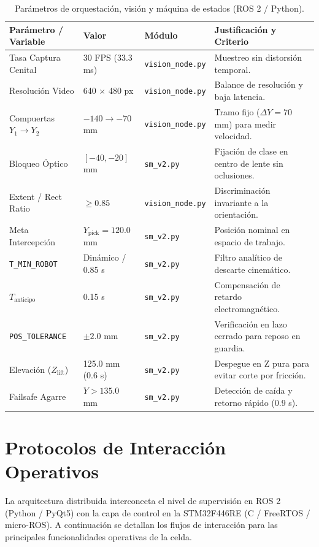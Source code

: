\documentclass[12pt, a4paper]{report}
\begin{document}
\begin{table}[H]
\centering
\small
\begin{tabularx}{\linewidth}{|p{3.1cm}|p{2.2cm}|p{2.5cm}|X|}
\hline
\textbf{Parámetro / Variable} & \textbf{Valor} & \textbf{Módulo} & \textbf{Justificación y Criterio} \\
\hline
Tasa Captura Cenital & 30 FPS (33.3 ms) & \texttt{vision\_node.py} & Muestreo sin distorsión temporal. \\
\hline
Resolución Video & 640 $\times$ 480 px & \texttt{vision\_node.py} & Balance de resolución y baja latencia. \\
\hline
Compuertas $Y_1 \rightarrow Y_2$ & $-140 \rightarrow -70$ mm & \texttt{vision\_node.py} & Tramo fijo ($\Delta Y = 70$ mm) para medir velocidad. \\
\hline
Bloqueo Óptico & $[-40, -20]$ mm & \texttt{sm\_v2.py} & Fijación de clase en centro de lente sin oclusiones. \\
\hline
Extent / Rect Ratio & $\ge 0.85$ & \texttt{vision\_node.py} & Discriminación invariante a la orientación. \\
\hline
Meta Intercepción & $Y_{\text{pick}} = 120.0$ mm & \texttt{sm\_v2.py} & Posición nominal en espacio de trabajo. \\
\hline
\texttt{T\_MIN\_ROBOT} & Dinámico / 0.85 s & \texttt{sm\_v2.py} & Filtro analítico de descarte cinemático. \\
\hline
$T_{\text{anticipo}}$ & 0.15 s & \texttt{sm\_v2.py} & Compensación de retardo electromagnético. \\
\hline
\texttt{POS\_TOLERANCE} & $\pm 2.0$ mm & \texttt{sm\_v2.py} & Verificación en lazo cerrado para reposo en guardia. \\
\hline
Elevación ($Z_{\text{lift}}$) & 125.0 mm (0.6 s) & \texttt{sm\_v2.py} & Despegue en Z pura para evitar corte por fricción. \\
\hline
Failsafe Agarre & $Y > 135.0$ mm & \texttt{sm\_v2.py} & Detección de caída y retorno rápido (0.9 s). \\
\hline
\end{tabularx}
\caption{Parámetros de orquestación, visión y máquina de estados (ROS 2 / Python).}
\label{tab:parametros_supervisor}
\end{table}

\section{Protocolos de Interacción Operativos}
La arquitectura distribuida interconecta el nivel de supervisión en ROS 2 (Python / PyQt5) con la capa de control en la STM32F446RE (C / FreeRTOS / micro-ROS). A continuación se detallan los flujos de interacción para las principales funcionalidades operativas de la celda.
\end{document}
